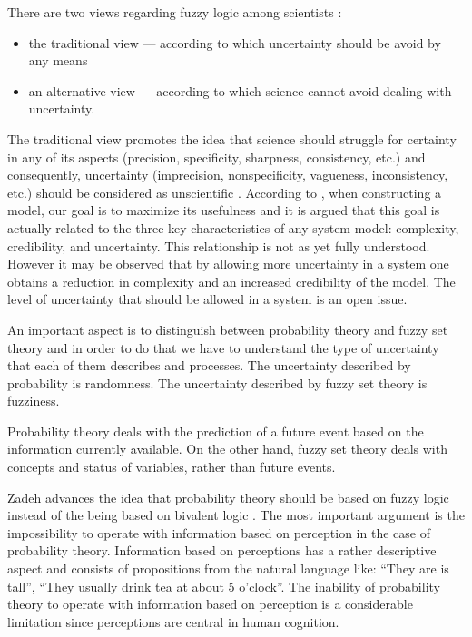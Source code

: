 There are two views regarding fuzzy logic among scientists  \cite{Klir95Fuzzy}: 
\begin{itemize}
\item the traditional view --- according to which uncertainty should be avoid by any means
\item an alternative view --- according to which science cannot avoid dealing with uncertainty.
\end{itemize}

The traditional view promotes the idea that science should struggle for certainty in any of its aspects (precision, specificity, sharpness, consistency, etc.) and consequently, uncertainty (imprecision, nonspecificity, vagueness, inconsistency, etc.) should be considered as unscientific \cite{Klir95Fuzzy}. 
According to \cite{Klir95Fuzzy}, when constructing a model, our goal is to maximize its usefulness and it is argued that this goal is actually related to the three key characteristics of any system model: complexity, credibility, and uncertainty. This relationship is not as yet fully understood. However it may be observed that by allowing more uncertainty in a system one obtains a reduction in complexity and an increased credibility of the model. 
The level of uncertainty that should be allowed in a system is an open issue.

An important aspect is to distinguish between probability theory and fuzzy set theory and in order to do that we have to understand the type of uncertainty that each of them describes and processes. The uncertainty described by probability is randomness. The uncertainty described by fuzzy set theory is fuzziness.

Probability theory deals with the prediction of a future event based on the information currently available. On the other hand, fuzzy set theory deals with concepts and status of variables, rather than future events. 

Zadeh advances the idea that probability theory should be based on fuzzy logic instead of the being based on bivalent logic \cite{Zadeh02Toward}. The most important argument is the impossibility to operate with information based on perception in the case of probability theory. Information based on perceptions has a rather descriptive aspect and consists of propositions from the natural language like: ``They are is tall'', ``They usually drink tea at about 5 o'clock''. The inability of probability theory to operate with information based  on perception is a considerable limitation since perceptions are central in human cognition. 

